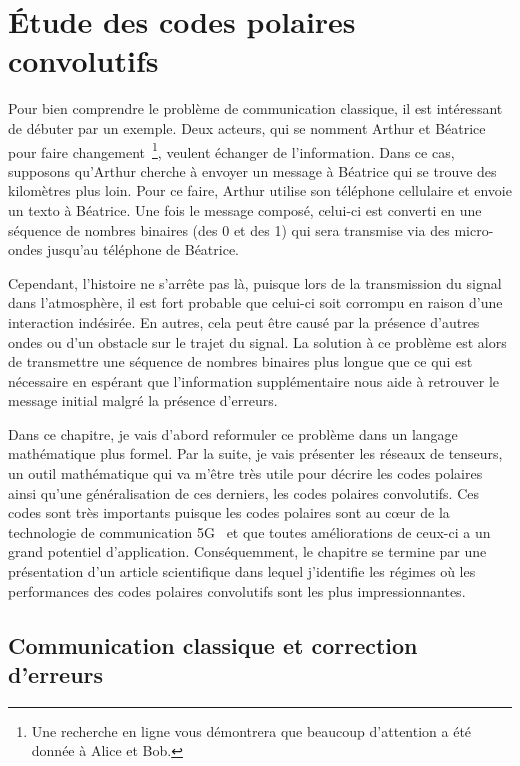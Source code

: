 \begin{comment}
\end{comment}

\chapter{Étude des codes polaires convolutifs}
\label{chap:codes_polaires}

Pour bien comprendre le problème de communication classique,
il est intéressant de débuter par un exemple.
Deux acteurs, 
qui se nomment Arthur et Béatrice pour faire changement~\footnote{
  Une recherche en ligne vous démontrera que beaucoup d'attention a été donnée 
  à Alice et Bob. 
},
veulent échanger de l'information.
Dans ce cas,
supposons qu'Arthur cherche à envoyer un message à Béatrice qui se trouve
des kilomètres plus loin.
Pour ce faire,
Arthur utilise son téléphone cellulaire et envoie un texto à Béatrice.
Une fois le message composé,
celui-ci est converti en une séquence de nombres binaires (des 0 et des 1)
qui sera transmise via des micro-ondes jusqu'au téléphone de Béatrice.

Cependant, 
l'histoire ne s'arrête pas là,
puisque lors de la transmission du signal dans l'atmosphère,
il est fort probable que celui-ci soit corrompu en raison d'une interaction indésirée.
En autres, 
cela peut être causé par la présence d'autres ondes ou d'un obstacle sur le trajet du signal.
La solution à ce problème est alors de transmettre une séquence de nombres binaires
plus longue que ce qui est nécessaire en espérant que l'information supplémentaire
nous aide à retrouver le message initial malgré la présence d'erreurs.

Dans ce chapitre,
je vais d'abord reformuler ce problème dans un langage mathématique plus formel.  
Par la suite, 
je vais présenter les réseaux de tenseurs,
un outil mathématique qui va m'être très utile pour décrire les codes polaires 
ainsi qu'une généralisation de ces derniers, les codes polaires convolutifs.
Ces codes sont très importants puisque les codes polaires sont au cœur 
de la technologie de communication 5G~\cite{bioglio_design_2021}
et que toutes améliorations de ceux-ci a un grand potentiel d'application.
Conséquemment,
le chapitre se termine par une présentation d'un article scientifique dans lequel
j'identifie les régimes où les performances des codes polaires convolutifs sont les plus impressionnantes.

\section{Communication classique et correction d'erreurs}

